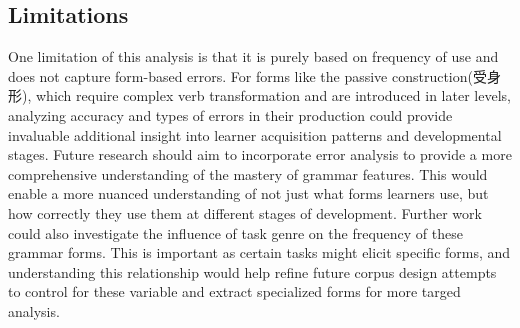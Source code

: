 \subsection{Limitations}
One limitation of
this analysis is that it is purely based on frequency of use and does not capture form-based errors. For forms like the
passive construction(受身形), which require complex verb transformation and are introduced in later levels, analyzing
accuracy and types of errors in their production could provide invaluable additional insight into learner
acquisition patterns and developmental stages. Future research should aim to incorporate error analysis to provide a
more comprehensive understanding of the mastery of grammar features. This would enable a more nuanced understanding
of not just what forms learners use, but how correctly they use them at different stages of development. Further
work could also investigate the influence of task genre on the frequency of these grammar forms. This is important
as certain tasks might elicit specific forms, and understanding this relationship would help refine future corpus
design attempts to control for these variable and extract specialized forms for more targed analysis.